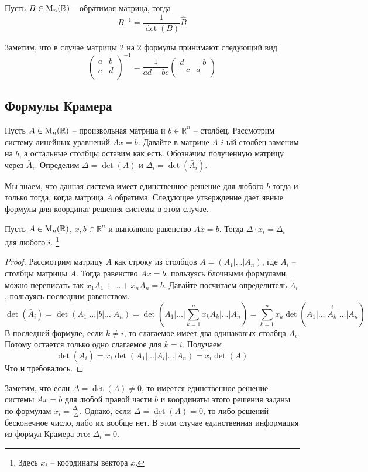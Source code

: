 \begin{claim}
Пусть $B\in\operatorname{M}_{n}(\mathbb R)$ -- обратимая матрица, тогда 
\[
B^{-1} = \frac{1}{\det(B)}\hat B
\]
\end{claim}

Заметим, что в случае матрицы $2$ на $2$ формулы принимают следующий вид
\[
\begin{pmatrix}
{a}&{b}\\
{c}&{d}\\
\end{pmatrix}^{-1}
=
\frac{1}{ad - bc}
\begin{pmatrix}
{d}&{-b}\\
{-c}&{a}\\
\end{pmatrix}
\]

\subsection{Формулы Крамера}

Пусть $A\in\operatorname{M}_{n}(\mathbb R)$ -- произвольная матрица и $b\in\mathbb R^n$ -- столбец.
Рассмотрим систему линейных уравнений $Ax = b$.
Давайте в матрице $A$ $i$-ый столбец заменим на $b$, а остальные столбцы оставим как есть.
Обозначим полученную матрицу через $\bar A_i$.
Определим $\Delta = \det (A)$ и $\Delta_i = \det (\bar A_i)$.

Мы знаем, что данная система имеет единственное решение для любого $b$ тогда и только тогда, когда матрица $A$ обратима.
Следующее утверждение дает явные формулы для координат решения системы в этом случае.

\begin{claim}
Пусть $A\in\operatorname{M}_{n}(\mathbb R)$, $x,b\in \mathbb R^n$ и выполнено равенство $Ax = b$.
Тогда $\Delta \cdot x_i = \Delta_i$ для любого $i$.%
\footnote{Здесь $x_i$ -- координаты вектора $x$.}
\end{claim}
\begin{proof}
Рассмотрим матрицу $A$ как строку из столбцов $A = (A_1|\ldots|A_n)$, где $A_i$ -- столбцы матрицы $A$.
Тогда равенство $Ax = b$, пользуясь блочными формулами, можно переписать так $x_1 A_1 + \ldots + x_n A_n = b$.
Давайте посчитаем определитель $\bar A_i$, пользуясь последним равенством.
\[
\det (\bar A_i) = \det(A_1|\ldots|b|\ldots|A_n) = \det(A_1|\ldots|\sum_{k=1}^n x_k A_k|\ldots|A_n) = \sum_{k=1}^n x_k \det (
\stackrel{i}{A_1|\ldots|A_k|\ldots|A_n})
\]
В последней формуле, если $k\neq i$, то слагаемое имеет два одинаковых столбца $A_i$.
Потому остается только одно слагаемое для $k = i$.
Получаем
\[
\det(\bar A_i) = x_i \det(A_1|\ldots|A_i|\ldots|A_n) = x_i \det(A)
\]
Что и требовалось.
\end{proof}

Заметим, что если $\Delta = \det (A) \neq 0$, то имеется единственное решение системы $Ax = b$ для любой правой части $b$ и координаты этого решения заданы по формулам $x_i =\frac{\Delta_i}{\Delta}$.
Однако, если $\Delta = \det(A) = 0$, то либо решений бесконечное число, либо их вообще нет.
В этом случае единственная информация из формул Крамера это: $\Delta_i = 0$.
